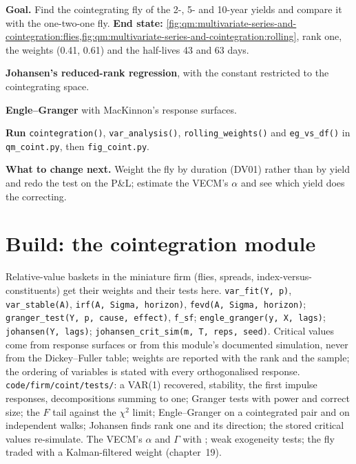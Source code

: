 \begin{tutorial}
\textbf{Goal.} Find the cointegrating fly of the 2-, 5- and 10-year yields and compare it with the one-two-one fly.
\textbf{End state:} \cref{fig:qm:multivariate-series-and-cointegration:flies,fig:qm:multivariate-series-and-cointegration:rolling}, rank one, the weights (0.41,
0.61) and the half-lives 43 and 63 days.
\begin{tutsteps}
\item \textbf{Johansen's reduced-rank regression}, with the constant restricted to the cointegrating space.
\label{lst:qm:multivariate-series-and-cointegration:johansen}
\item \textbf{Engle--Granger} with MacKinnon's response surfaces.
\label{lst:qm:multivariate-series-and-cointegration:eg}
\item \textbf{Run} \texttt{cointegration()}, \texttt{var\_analysis()}, \texttt{rolling\_weights()} and \texttt{eg\_vs\_df()} in \texttt{qm\_coint.py}, then
\texttt{fig\_coint.py}.
\end{tutsteps}
\textbf{What to change next.} Weight the fly by duration (DV01) rather than by yield and redo the test on the P\&L; estimate the VECM's $\alpha$ and see which yield
does the correcting.
\end{tutorial}

\section{Build: the cointegration module}\label{bld:qm:multivariate-series-and-cointegration:coint}

\begin{build}
 Relative-value baskets in the miniature firm (flies, spreads, index-versus-constituents) get their weights and their tests here.
 \texttt{var\_fit(Y, p)}, \texttt{var\_stable(A)}, \texttt{irf(A, Sigma, horizon)}, \texttt{fevd(A, Sigma, horizon)}; \texttt{granger\_test(Y,
p, cause, effect)}, \texttt{f\_sf}; \texttt{engle\_granger(y, X, lags)}; \texttt{johansen(Y, lags)}; \texttt{johansen\_crit\_sim(m, T, reps, seed)}.
 Critical values come from response surfaces or from this module's documented simulation, never from the Dickey--Fuller table; weights are reported
with the rank and the sample; the ordering of variables is stated with every orthogonalised response.
 \texttt{code/firm/coint/tests/}: a VAR(1) recovered, stability, the first impulse responses, decompositions summing to one; Granger tests with
power and correct size; the $F$ tail against the $\chi^2$ limit; Engle--Granger on a cointegrated pair and on independent walks; Johansen finds rank one and its
direction; the stored critical values re-simulate.
 The VECM's $\alpha$ and $\Gamma$ with ; weak exogeneity tests; the fly traded with a Kalman-filtered weight (chapter~19).
\end{build}

